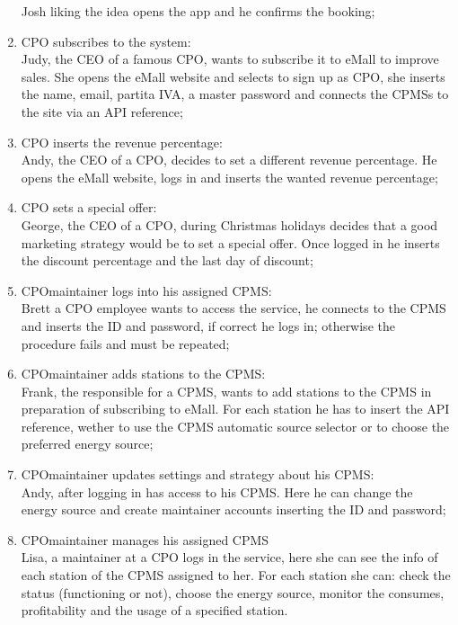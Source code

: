 \begin{enumerate}[label=\textbf{S\arabic*}]
            Josh liking the idea opens the app and he confirms the booking;\label{SCE:user-gets-suggestions}
      \item \ac{CPO} subscribes to the system:\\
            Judy, the CEO of a famous \ac{CPO}, wants to subscribe it to \ac{eMall} to improve sales.
            She opens the eMall website and selects to sign up as \ac{CPO}, she inserts the name, email, \gls{partita IVA}, a master password and connects the \acp{CPMS} to the site via an \ac{API} reference;\label{SCE:cpo-signs-up}
      \item \ac{CPO} inserts the revenue percentage:\\
            Andy, the CEO of a \ac{CPO}, decides to set a different revenue percentage. He opens the eMall website, logs in and inserts the wanted revenue percentage;\label{SCE:cpo-sets-revenue-percentage}
      \item \ac{CPO} sets a special offer:\\
            George, the CEO of a \ac{CPO}, during Christmas holidays decides that a good marketing strategy would be to set a special offer. Once logged in he inserts the discount percentage and the last day of discount; \label{SCE:cpo-sets-special-offer}
      \item \ac{CPO}maintainer logs into his assigned \ac{CPMS}:\\
            Brett a \ac{CPO} employee wants to access the service, he connects to the \ac{CPMS} and inserts the ID
            and password, if correct he logs in; otherwise the procedure fails and must be repeated;\label{SCE:cpomaintainer-logs-in}
      \item \ac{CPO}maintainer adds stations to the \ac{CPMS}:\\
            Frank, the responsible for a \ac{CPMS}, wants to add stations to the \ac{CPMS} in preparation of subscribing to eMall. For each station he has to insert the \ac{API} reference,
            wether to use the \ac{CPMS} automatic source selector or to choose the preferred energy source;\label{SCE:cpomaintainer-adds-stations}
      \item \ac{CPO}maintainer updates settings and strategy about his \ac{CPMS}:\\
            Andy, after logging in has access to his \ac{CPMS}.
            Here he can change the energy source and create maintainer accounts inserting the ID and password;\label{SCE:cpomaintainer-updates-settings}
      \item \ac{CPO}maintainer manages his assigned \ac{CPMS}\\
            Lisa, a maintainer at a \ac{CPO} logs in the service, here she can see the info of each station of the \ac{CPMS} assigned to her.
            For each station she can: check the status (functioning or not), choose the energy source, monitor the consumes, profitability and the usage of a specified station.\label{SCE:cpomaintainer-manages}
\end{enumerate}

